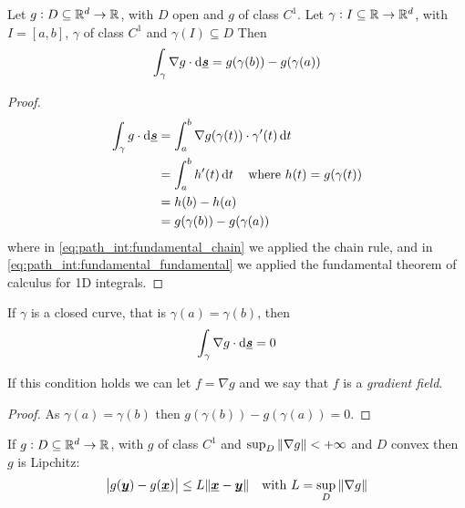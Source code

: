 \documentclass[12pt]{extarticle}
\renewcommand{\vec}[1]{\uvec{#1}}
\begin{document}
\begin{theorem}
    Let $g: D \subseteq \mathbb{R}^d \to \mathbb{R}$, with $D$ open and $g$ of class $C^1$.
    Let $\gamma: I \subseteq \mathbb{R} \to \mathbb{R}^d$, with $I = [a, b]$, $\gamma$ of class $C^1$ and $\gamma(I) \subseteq D$
    Then
    \begin{equation}
        \int_\gamma \nabla g \cdot \dd{\vec s} = g(\gamma(b))-g(\gamma(a))
    \end{equation}
\end{theorem}

\begin{proof}
    \begin{align}
        \int_\gamma g \cdot \dd{\vec s} & = \int_a^b \nabla g(\gamma(t)) \cdot \gamma'(t) \dd{t}                                                \\
                                        & = \int_a^b h'(t) \dd{t} \quad \text{where } h(t) = g(\gamma(t)) \label{eq:path_int:fundamental_chain} \\
                                        & = h(b) - h(a) \label{eq:path_int:fundamental_fundamental}                                             \\
                                        & = g(\gamma(b)) - g(\gamma(a))
    \end{align}
    where in \autoref{eq:path_int:fundamental_chain} we applied the chain rule, and in \autoref{eq:path_int:fundamental_fundamental} we applied the fundamental theorem of calculus for 1D integrals.
\end{proof}

\begin{corollary}
    If $\gamma$ is a closed curve, that is $\gamma(a) = \gamma(b)$, then
    \begin{equation}
        \int_\gamma \nabla g \cdot \dd{\vec s} = 0
    \end{equation}

    If this condition holds we can let $f = \nabla g$ and we say that $f$ is a \emph{gradient field}.
\end{corollary}

\begin{proof}
    As $\gamma(a) = \gamma(b)$ then $g(\gamma(b)) - g(\gamma(a)) = 0$.
\end{proof}

\begin{corollary}
    If $g: D \subseteq \mathbb{R}^d \to \mathbb{R}$, with $g$ of class $C^1$ and $\sup_D \norm{\nabla g} < +\infty$ and $D$ convex then $g$ is Lipchitz:
    \begin{equation}
        \abs{g(\vec y) - g(\vec x)} \leq L \norm{\vec x - \vec y} \quad \text{with } L = \sup_D \norm{\nabla g}
    \end{equation}
\end{corollary}
\end{document}
